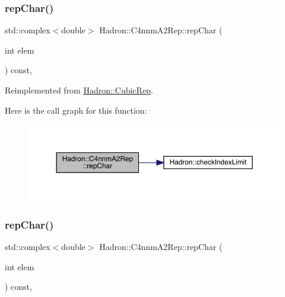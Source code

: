 \subsubsection{\texorpdfstring{repChar()}{repChar()}\hspace{0.1cm}{\footnotesize\ttfamily [2/3]}}
{\footnotesize\ttfamily std\+::complex$<$double$>$ Hadron\+::\+C4nnm\+A2\+Rep\+::rep\+Char (\begin{DoxyParamCaption}\item[{int}]{elem }\end{DoxyParamCaption}) const\hspace{0.3cm}{\ttfamily [inline]}, {\ttfamily [virtual]}}



Reimplemented from \mbox{\hyperlink{structHadron_1_1CubicRep_af45227106e8e715e84b0af69cd3b36f8}{Hadron\+::\+Cubic\+Rep}}.

Here is the call graph for this function\+:
\nopagebreak
\begin{figure}[H]
\begin{center}
\leavevmode
\includegraphics[width=350pt]{d6/d9a/structHadron_1_1C4nnmA2Rep_afb88da7160e06ad4085c5ed34d410bbc_cgraph}
\end{center}
\end{figure}
\mbox{\label{structHadron_1_1C4nnmA2Rep_afb88da7160e06ad4085c5ed34d410bbc}} 
\subsubsection{\texorpdfstring{repChar()}{repChar()}\hspace{0.1cm}{\footnotesize\ttfamily [3/3]}}
{\footnotesize\ttfamily std\+::complex$<$double$>$ Hadron\+::\+C4nnm\+A2\+Rep\+::rep\+Char (\begin{DoxyParamCaption}\item[{int}]{elem }\end{DoxyParamCaption}) const\hspace{0.3cm}{\ttfamily [inline]}, {\ttfamily [virtual]}}



